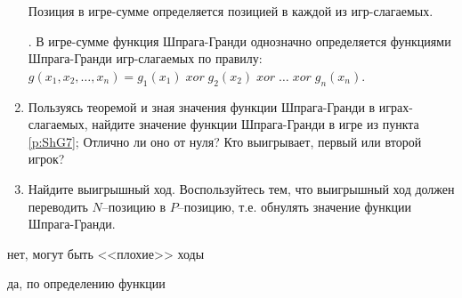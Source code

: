 \begin{problem}
\begin{enumerate}
Позиция в игре-сумме определяется позицией в каждой из игр-слагаемых.\par
{}.
В игре-сумме функция Шпрага-Гранди однозначно определяется функциями Шпрага-Гранди игр-слагаемых по правилу:  $g\left(x_{1},x_{2},\ldots,x_{n} \right)=g_{1} \left(x_{1} \right)\; xor\; g_{2} \left(x_{2} \right)\; xor\; \ldots \; xor\; g_{n} \left(x_{n} \right)$.
\item	Пользуясь теоремой и зная значения функции Шпрага-Гранди в играх-слагаемых, найдите значение функции Шпрага-Гранди в игре из пункта \ref{p:ShG7}; Отлично ли оно от нуля? Кто выигрывает, первый или второй игрок?\par
\item	Найдите выигрышный ход. Воспользуйтесь тем, что выигрышный ход должен переводить  $N$--позицию в  $P$--позицию, т.е. обнулять значение функции Шпрага-Гранди.
\end{enumerate}


\begin{sol}
\item нет, могут быть <<плохие>> ходы \par
\item да, по определению функции
\end{sol}
\end{problem}



